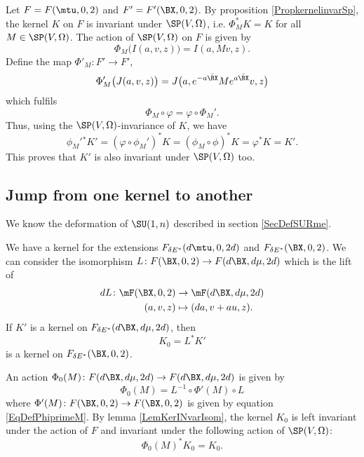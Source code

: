 Let $F=F(\mtu,0,2)$ and $F'=F'(\BX,0,2)$. By proposition \ref{PropkernelinvarSp},  the kernel $K$ on $F$ is invariant under $\SP(V,\Omega)$, i.e. $\Phi^*_{M}K=K$ for all $M\in\SP(V,\Omega)$. The action of $\SP(V,\Omega)$ on $F$ is given by
\[ 
  \Phi_{M}\big( I(a,v,z) \big)=I(a,Mv,z).
\]
Define the map $\Phi'_M\colon F'\to F'$,
\begin{equation}   \label{EqDefPhiprimeM}
\Phi_{M}'\big( J(a,v,z) \big)=J\big( a, e^{-a\bar{\BX }}M e^{a\bar{\BX }}v,z \big)
\end{equation}
which fulfils 
\[ 
  \Phi_{M}\circ\varphi=\varphi\circ\Phi_{M}'.
\]
Thus, using the $\SP(V,\Omega)$-invariance of $K$, we have
\[ 
\phi_{M}'{}^*K'=(\varphi\circ\phi_{M}')^*K=(\phi_{M}\circ\phi)^*K=\varphi^*K=K'.
\]
This proves that $K'$ is also invariant under $\SP(V,\Omega)$ too.

\subsection{Jump from one kernel to another}

We know the deformation of $\SU(1,n)$ described in section \ref{SecDefSURme}.

We have a kernel for the extensions $F_{\delta E^*}(d\mtu,0,2d)$ and $F_{\delta E^*}(\BX ,0,2)$. We can consider the isomorphism $L\colon F(\BX ,0,2)\to F(d\BX ,d\mu,2d)$ which is the lift of
\begin{equation}
\begin{aligned}
 dL\colon \mF(\BX ,0,2)&\to \mF(d\BX ,d\mu,2d) \\ 
  (a,v,z)&\mapsto (da,v+au,z).
\end{aligned}
\end{equation}
If $K'$ is a kernel on $F_{\delta E^*}(d\BX ,d\mu,2d)$, then
\[ 
  K_{0}=L^*K'
\]
is a kernel on $F_{\delta E^*}(\BX ,0,2)$.

An action $\Phi_{0}(M)\colon F(d\BX ,d\mu,2d)\to F(d\BX ,d\mu,2d)$ is given by
\begin{equation}
  \Phi_{0}(M)=L^{-1}\circ\Phi'(M)\circ L
\end{equation}
where $\Phi'(M)\colon F(\BX ,0,2)\to F(\BX ,0,2)$ is given by equation \eqref{EqDefPhiprimeM}. By lemma \ref{LemKerINvarIsom}, the kernel $K_{0}$ is left invariant under the action of $F$ and invariant under the following action of $\SP(V,\Omega)$:
\[ 
  \Phi_{0}(M)^*K_{0}=K_{0}.
\]

